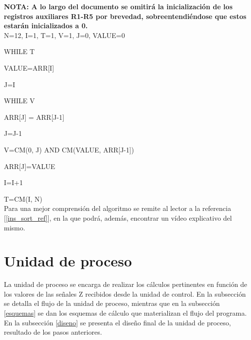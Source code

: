 \documentclass[12pt,a4paper,oneside]{article}
\begin{document}
\textbf{NOTA: A lo largo del documento se omitirá la inicialización de los registros auxiliares R1-R5 
por brevedad, sobreentendiéndose que estos estarán inicializados a 0.}\\

N=12, I=1, T=1, V=1, J=0, VALUE=0

WHILE T

{\addtolength{\leftskip}{10 mm}
VALUE=ARR[I]

J=I

WHILE V

}

{\addtolength{\leftskip}{20 mm}
ARR[J] = ARR[J-1]

J=J-1

V=CM(0, J) AND CM(VALUE, ARR[J-1])

}

ARR[J]=VALUE

I=I+1

T=CM(I, N)\\


Para una mejor comprensión del algoritmo se remite al lector a la referencia [\ref{ins_sort_ref}], en la que 
podrá, además, encontrar un vídeo explicativo del mismo.


\section{Unidad de proceso} \label{ud_proceso}
La unidad de proceso se encarga de realizar los cálculos pertinentes en función de los valores de las señales Z 
recibidos desde la unidad de control. En la subsección se detalla el flujo de la unidad de proceso, mientras que 
en la subsección \ref{esquemas} se dan los esquemas de cálculo que materializan el flujo del programa. En la 
subsección \ref{diseno} se presenta el diseño final de la unidad de proceso, resultado de los pasos anteriores.
\end{document}
